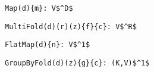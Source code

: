 \begin{figure*}
\centering

\newsavebox{\Map}
\begin{lrbox}{\Map}
\begin{lstlisting}[language=PPLTable]
Map(d){m}: V$^D$
\end{lstlisting}
\end{lrbox}

\newsavebox{\MultiFold}
\begin{lrbox}{\MultiFold}
\begin{lstlisting}[language=PPLTable]
MultiFold(d)(r)(z){f}{c}: V$^R$
\end{lstlisting}
\end{lrbox}

\newsavebox{\FlatMap}
\begin{lrbox}{\FlatMap}
\begin{lstlisting}[language=PPLTable]
FlatMap(d){n}: V$^1$
\end{lstlisting}
\end{lrbox}



\newsavebox{\GroupByFold}
\begin{lrbox}{\GroupByFold}
\begin{lstlisting}[language=PPLTable]
GroupByFold(d)(z){g}{c}: (K,V)$^1$
\end{lstlisting}
\end{lrbox}



\end{figure*}
